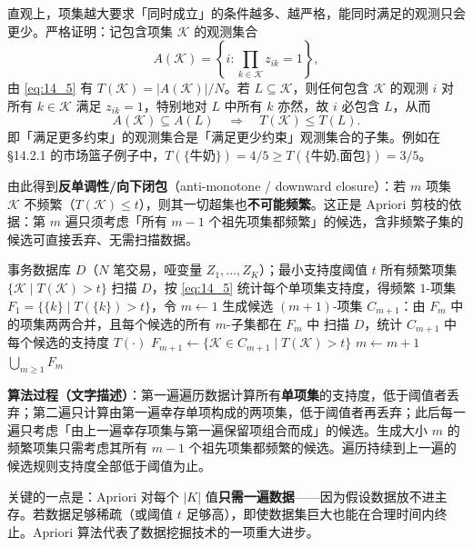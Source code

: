 \begin{remark}[单调性为什么成立]
直观上，项集越大要求「同时成立」的条件越多、越严格，能同时满足的观测只会更少。严格证明：记包含项集 $\mathcal{K}$ 的观测集合
\[
A(\mathcal{K}) = \left\{ i : \prod_{k\in\mathcal{K}} z_{ik} = 1 \right\},
\]
由 \eqref{eq:14_5} 有 $T(\mathcal{K}) = |A(\mathcal{K})|/N$。若 $L\subseteq\mathcal{K}$，则任何包含 $\mathcal{K}$ 的观测 $i$ 对所有 $k\in\mathcal{K}$ 满足 $z_{ik}=1$，特别地对 $L$ 中所有 $k$ 亦然，故 $i$ 必包含 $L$，从而
\[
A(\mathcal{K})\subseteq A(L) \quad\Longrightarrow\quad T(\mathcal{K})\le T(L).
\]
即「满足更多约束」的观测集合是「满足更少约束」观测集合的子集。例如在 §14.2.1 的市场篮子例子中，$T(\{\text{牛奶}\})=4/5\ge T(\{\text{牛奶,面包}\})=3/5$。

由此得到\textbf{反单调性/向下闭包}（anti-monotone / downward closure）：若 $m$ 项集 $\mathcal{K}$ 不频繁（$T(\mathcal{K})\le t$），则其一切超集也\textbf{不可能频繁}。这正是 Apriori 剪枝的依据：第 $m$ 遍只须考虑「所有 $m-1$ 个祖先项集都频繁」的候选，含非频繁子集的候选可直接丢弃、无需扫描数据。
\end{remark}

\begin{algorithm}[H]
\caption{Apriori 算法（市场篮子）}
\begin{algorithmic}[1]
\Require 事务数据库 $D$（$N$ 笔交易，哑变量 $Z_1,\dots,Z_K$）；最小支持度阈值 $t$
\Ensure 所有频繁项集 $\{\mathcal{K}\mid T(\mathcal{K})>t\}$
\State 扫描 $D$，按 \eqref{eq:14_5} 统计每个单项集支持度，得频繁 $1$-项集 $F_1=\{\{k\}\mid T(\{k\})>t\}$，令 $m\leftarrow 1$
  \State 生成候选 $(m{+}1)$-项集 $C_{m+1}$：由 $F_m$ 中的项集两两合并，且每个候选的所有 $m$-子集都在 $F_m$ 中
  \State 扫描 $D$，统计 $C_{m+1}$ 中每个候选的支持度 $T(\cdot)$
  \State $F_{m+1}\leftarrow\{\mathcal{K}\in C_{m+1}\mid T(\mathcal{K})>t\}$
  \State $m\leftarrow m+1$
\EndWhile
\State \Return $\bigcup_{m\ge 1} F_m$
\end{algorithmic}
\end{algorithm}

\textbf{算法过程（文字描述）}：第一遍遍历数据计算所有\textbf{单项集}的支持度，低于阈值者丢弃；第二遍只计算由第一遍幸存单项构成的两项集，低于阈值者再丢弃；此后每一遍只考虑「由上一遍幸存项集与第一遍保留项组合而成」的候选。生成大小 $m$ 的频繁项集只需考虑其所有 $m-1$ 个祖先项集都频繁的候选。遍历持续到上一遍的候选规则支持度全部低于阈值为止。

关键的一点是：Apriori 对每个 $|K|$ 值\textbf{只需一遍数据}——因为假设数据放不进主存。若数据足够稀疏（或阈值 $t$ 足够高），即使数据集巨大也能在合理时间内终止。Apriori 算法代表了数据挖掘技术的一项重大进步。

